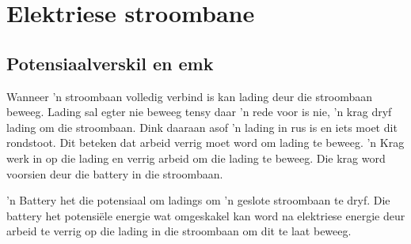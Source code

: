 \chapter{Elektriese stroombane}

\section{Potensiaalverskil en emk}

Wanneer 'n stroombaan volledig verbind is kan lading deur die stroombaan
beweeg. Lading sal egter nie beweeg tensy daar 'n rede voor is nie, 'n krag dryf lading om die stroombaan. Dink daaraan asof 'n lading in rus is en iets
moet dit rondstoot. Dit beteken dat arbeid verrig moet word om lading te
beweeg. 'n Krag werk in op die lading en verrig arbeid om die lading te beweeg.
Die krag word voorsien deur die battery in die stroombaan.

'n Battery het die potensiaal om ladings om 'n geslote stroombaan te dryf. Die
battery het potensi\"ele energie wat omgeskakel kan word na elektriese energie
deur arbeid te verrig op die lading in die stroombaan om dit te laat beweeg.


